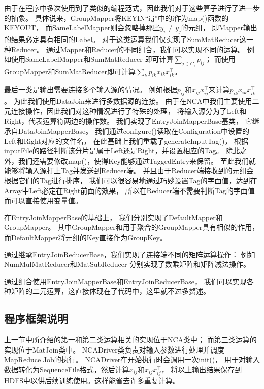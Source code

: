 \documentclass[a4paper,UTF8]{article}
\theoremstyle{definition}
\begin{document}
由于在程序中多次使用到了类似的编程范式，因此我们对于这些算子进行了进一步的抽象。
具体说来，GroupMapper将KEYIN``i,j''中的i作为map()函数的KEYOUT，
而SameLabelMapper则会忽略掉那些$y_i \neq y_j$的元组，
即Mapper输出的结果必定具有相同的Label。
对于这类运算我们仅实现了SumMatReducer这一种Reducer。
通过Mapper和Reducer的不同组合，我们可以实现不同的运算。
例如使用SameLabelMapper和SumMatReducer
即可计算$\sum_{j \in C_{i}} p_{ij}$；
而使用GroupMapper和SumMatReducer即可计算$\sum_{k} p_{ik} x_{ik} x_{ik}^\top$。

最后一类是输出需要连接多个输入源的情况。
例如根据$p_{ij}$和$x_{ij} x_{ij}^\top$来计算$p_{ik} x_{ik} x_{ik}^\top$。
为此我们使用DataJoin来进行多数据源的连接。
由于在NCA中我们主要使用二元连接操作，因此我们对这种情况进行了特殊的处理，
将输入源分为了Left和Right，代表运算符两边的操作数。
我们实现了EntryJoinMapperBase基类，
它继承自DataJoinMapperBase。
我们通过configure()读取在Configuration中设置的Left和Right对应的文件名，
在此基础上我们重载了generateInputTag()，
根据inputFile的路径判断该分片是属于Left还是Right，并设置相应的Tag。
除此之外，我们还需要修改map()，使得Key能够通过TaggedEntry来保留。
至此我们就能够将输入源打上Tag并发送到Reducer端。
并且由于Reducer端接收到的元组会根据它们的Tag进行排序，
我们可以很容易地通过巧妙设置Tag的字面值，达到在Array中Left必定在Right前面的效果，
所以在Reducer端不需要判断Tag的字面值而可以直接使用变量值。

在EntryJoinMapperBase的基础上，
我们分别实现了DefaultMapper和GroupMapper。
其中GroupMapper和用于聚合的GroupMapper具有相似的作用，
而DefaultMapper将元组的Key直接作为GroupKey。

通过继承EntryJoinReducerBase，我们实现了连接端不同的矩阵运算操作：
例如NumMulMatReducer和MatSubReducer
分别实现了数乘矩阵和矩阵减法操作。

通过组合使用EntryJoinMapperBase和EntryJoinReducerBase，
我们可以实现各种矩阵的二元运算，这直接体现在了代码中，这里就不过多赘述。

\subsection*{程序框架说明}

上一节中所介绍的第一和第二类运算相关的实现位于NCA类中；
而第三类运算的实现位于MatJoin类中。
NCADriver类负责对输入参数进行处理并调度MapReduce Job的执行。
NCADriver在开始执行时会调用一次init()，
用于对输入数据转化为SequenceFile格式，然后计算$x_{ij}$和$x_{ij} x_{ij}^\top$，
将以上输出结果保存到HDFS中以供后续训练使用。这样能省去许多重复计算。
\end{document}

